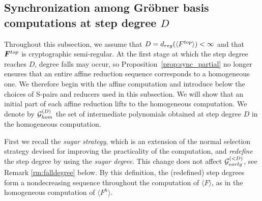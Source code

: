 \documentclass{article}
\theoremstyle{definition}
\theoremstyle{plain}
\theoremstyle{plain}
\theoremstyle{plain}
\theoremstyle{plain}
\numberwithin{equation}{subsection}
\begin{document}
\subsection{Synchronization among Gr\"obner basis computations at step degree $D$}\label{subsec:overD}

Throughout this subsection, we assume that $D=d_{\rm reg}(\langle F^{\rm top}\rangle)<\infty$ and that $\bm F^{\rm top}$ is cryptographic semi-regular.
At the first stage at which the step degree reaches $D$, degree falls may occur, so Proposition~\ref{prop:sync_partial} no longer ensures that an entire affine reduction sequence corresponds to a homogeneous one.
We therefore begin with the affine computation and introduce below the choices of S-pairs and reducers used in this subsection.
We will show that an initial part of each affine reduction lifts to the homogeneous computation.
We denote by $\mathcal G_{\rm hom}^{(D)}$ the set of intermediate polynomials obtained at step degree $D$ in the homogeneous computation.

First we recall the {\em sugar strategy}, which is an extension of the normal selection strategy devised for improving the practicality of the computation, and {\em redefine} the step degree by using the {\em sugar degree}.
This change does not affect $\mathcal{G}_{\rm early}^{(<D)}$, see Remark \ref{rm:falldegree} below.
By this definition, the (redefined) step degrees form a nondecreasing sequence throughout the computation of $\langle F\rangle$, as in the homogeneous computation of $\langle F^h\rangle$.
\end{document}
